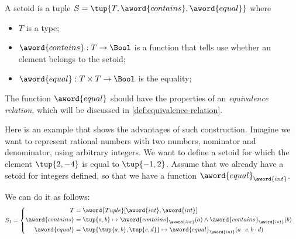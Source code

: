 \begin{ctdefinition}[Setoid]
    A setoid is a tuple $S = \tup{T, \aword{contains}, \aword{equal}}$ where
    \begin{itemize}
        \item $T$ is a type;
        \item $\aword{contains}:T\to\Bool$ is a function that tells use whether an element belongs to the setoid;
        \item $\aword{equal}:T\times T\to\Bool$ is the equality;
    \end{itemize}
\end{ctdefinition}
The function $\aword{equal}$ should have the properties of an \emph{equivalence relation},
which will be discussed in \cref{def:equivalence-relation}.

Here is an example that shows the advantages of such construction.
Imagine we want to represent rational numbers with two numbers, nominator and denominator, using arbitrary integers.
We want to define a setoid for which the element $\tup{2, -4}$ is equal to $\tup{-1, 2}$.
Assume that we already have a setoid for integers defined, so that we have a function $\aword{equal}_{\aword{int}}$.

We can do it as follows:
\begin{equation}
    S_1 =
    \begin{cases}
        \begin{aligned}
            T                & =
            \aword{Tuple}[\aword{int}, \aword{int}]
            \\
            \aword{contains} & = \tup{a,b} \mapsto \aword{contains}_{\aword{int}}(a)  \wedge \aword{contains}_{\aword{int}}(b)
            \\
            \aword{equal}    & = \tup{\tup{a,b}, \tup{c,d}}
            \mapsto \aword{equal}_{\aword{int}} (a\cdot c, b\cdot d)
        \end{aligned}
    \end{cases}
\end{equation}

